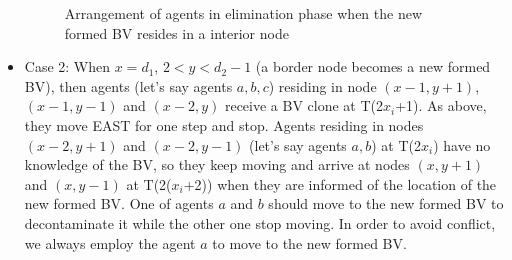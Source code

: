 \begin{itemize}
\begin{figure} [hbtp]
      \hspace{1in} 
  \caption{Arrangement of agents in elimination phase when the new formed BV resides in a interior node} 
  \label{fig:subfigmesh1} %
\end{figure}


\item Case 2: When $x=d_1$, $2<y<d_2-1$ (a border node becomes a new formed BV), then agents (let's say agents $a,b,c$) residing in node $(x-1, y+1)$, $(x-1, y-1)$ and $(x-2, y)$ receive a BV clone at T(2$x_i$+1). As above, they move EAST for one step and stop. Agents residing in nodes $(x-2, y+1)$ and $(x-2, y-1)$ (let's say agents $a,b$) at T(2$x_i$) have no knowledge of the BV, so they keep moving and arrive at nodes $(x, y+1)$ and $(x, y-1)$ at T(2($x_i$+2)) when they are informed of the location of the new formed BV. One of agents $a$ and $b$ should move to the new formed BV to decontaminate it while the other one stop moving. In order to avoid conflict, we always employ the agent $a$ to move to the new formed BV.


\end{itemize}
